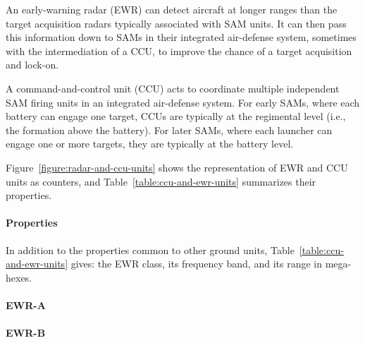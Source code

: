 

\clearpage
{}

An early-warning radar (EWR) can detect aircraft at longer ranges than the target acquisition radars typically associated with SAM units. It can then pass this information down to SAMs in their integrated air-defense system, sometimes with the intermediation of a CCU, to improve the chance of a target acquisition and lock-on.

A command-and-control unit (CCU) acts to coordinate multiple independent SAM firing units in an integrated air-defense system. For early SAMs, where each battery can engage one target, CCUs are typically at the regimental level (i.e., the formation above the battery). For later SAMs, where each launcher can engage one or more targets, they are typically at the battery level.

Figure~\ref{figure:radar-and-ccu-units} shows the representation of EWR and CCU units as counters, and Table~\ref{table:ccu-and-ewr-units} summarizes their properties.

\paragraph{Properties} In addition to the properties common to other ground units, Table~\ref{table:ccu-and-ewr-units} gives: the EWR class, its frequency band, and its range in mega-hexes.

\paragraph{EWR-A}
\paragraph{EWR-B}
